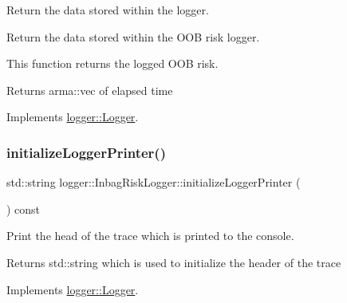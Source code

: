 Return the data stored within the logger. 

Return the data stored within the O\+OB risk logger.

This function returns the logged O\+OB risk.

\begin{DoxyReturn}{Returns}
{\ttfamily arma\+::vec} of elapsed time 
\end{DoxyReturn}


Implements \hyperlink{classlogger_1_1_logger_aa4fc254c532172db3404b7c0bcd17092}{logger\+::\+Logger}.

\mbox{\label{classlogger_1_1_inbag_risk_logger_ab793454f28dae8d0901852b41a910ec7}} 
\subsubsection{\texorpdfstring{initialize\+Logger\+Printer()}{initializeLoggerPrinter()}}
{\footnotesize\ttfamily std\+::string logger\+::\+Inbag\+Risk\+Logger\+::initialize\+Logger\+Printer (\begin{DoxyParamCaption}{ }\end{DoxyParamCaption}) const\hspace{0.3cm}{\ttfamily [virtual]}}



Print the head of the trace which is printed to the console. 

\begin{DoxyReturn}{Returns}
{\ttfamily std\+::string} which is used to initialize the header of the trace 
\end{DoxyReturn}


Implements \hyperlink{classlogger_1_1_logger_a825f96e8564ac4013ff09ef842c0aeec}{logger\+::\+Logger}.

\mbox{\label{classlogger_1_1_inbag_risk_logger_ad90612e1b684287a29bdbde1077d65d7}} 

